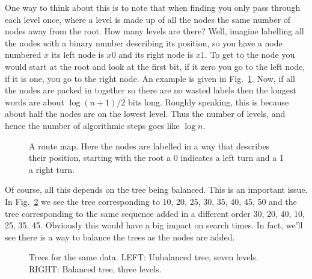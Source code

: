\documentclass[11pt,a4paper]{scrartcl}
\begin{document}
One way to think about this is to note that when finding you only pass
through each level once, where a level is made up of all the nodes the
same number of nodes away from the root. How many levels are there?
Well, imagine labelling all the nodes with a binary number describing
its position, so you have a node numbered $x$ its left node is $x0$
and its right node is $x1$. To get to the node you would start at the
root and look at the first bit, if it zero you go to the left node, if
it is one, you go to the right node. An example is given in
Fig.~\ref{fig_tree_route}. Now, if all the nodes are packed in
together so there are no wasted labels then the longest words are
about $\log{(n+1)/2}$ bits long. Roughly speaking, this is because
about half the nodes are on the lowest level. Thus the number of
levels, and hence the number of algorithmic steps goes like $\log{n}$.

\begin{figure}
\begin{center}
\end{center}
\caption{A route map. Here the nodes are labelled in a way that describes their position, starting with the root a 0 indicates a left turn and a 1 a right turn.\label{fig_tree_route}}
\end{figure}

Of course, all this depends on the tree being balanced. This is an
important issue. In Fig.~\ref{fig_balance} we see the tree
corresponding to 10, 20, 25, 30, 35, 40, 45, 50 and the tree
corresponding to the same sequence added in a different order 30, 20,
40, 10, 25, 35, 45. Obviously this would have a big impact on search
times. In fact, we'll see there is a way to balance the trees as the
nodes are added.

\begin{figure}
\begin{center}
\qquad
{}
\end{center}
\caption{Trees for the same data. LEFT: Unbalanced tree, seven levels. RIGHT: Balanced tree, three levels.\label{fig_balance}}
\end{figure}
\end{document}
